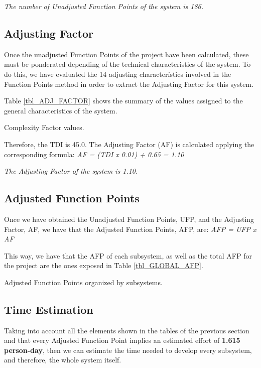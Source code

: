 \emph{The number of Unadjusted Function Points of the system is 186.}


\subsection{Adjusting Factor}
Once the unadjusted Function Points of the project have been calculated, these must be ponderated depending of the technical characteristics of the system. To do this, we have evaluated the 14 adjusting characterístics involved in the Function Points method in order to extract the Adjusting Factor for this system.

Table \ref{tbl_ADJ_FACTOR} shows the summary of the values assigned to the general characteristics of the system.

\begin{table}[hbtp]
\centering

\caption{Complexity Factor values.}
\label{tbl_ADJ_FACTOR}
\end{table}

Therefore, the TDI is 45.0. The Adjusting Factor (AF) is calculated applying the corresponding formula:
\emph{AF = (TDI x 0.01) + 0.65 = 1.10}

\emph{The Adjusting Factor of the system is 1.10.}

\subsection{Adjusted Function Points}
Once we have obtained the Unadjusted Function Points, UFP, and the Adjusting Factor, AF, we have that the Adjusted Function Points, AFP, are:
\emph{AFP = UFP x AF}

This way, we have that the AFP of each subsystem, as well as the total AFP for the project are the ones exposed in Table \ref{tbl_GLOBAL_AFP}.

\begin{table}[hbtp]
\centering

\caption{Adjusted Function Points organized by subsystems.}
\label{tbl_GLOBAL_AFP}
\end{table}

\newpage

\subsection{Time Estimation}

Taking into account all the elements shown in the tables of the previous section and that every Adjusted Function Point implies an estimated effort of \textbf{1.615 person-day}, then we can estimate the time needed to develop every subsystem, and therefore, the whole system itself.

